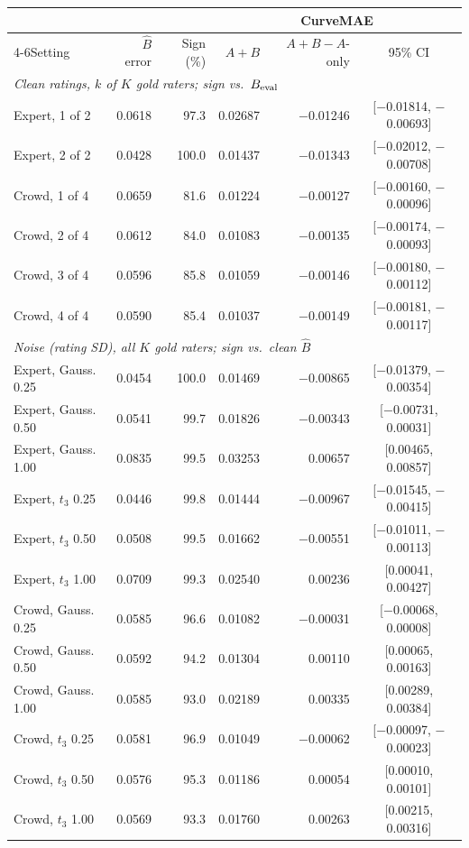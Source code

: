 \begin{tabular}{lrrrrc}
\toprule
 &  &  & \multicolumn{3}{c}{CurveMAE} \\
\cmidrule(lr){4-6}Setting & $\hat B$ error & Sign (\%) & $A{+}B$ & $A{+}B-A$-only & 95\% CI \\
\midrule
\multicolumn{6}{l}{\textit{Clean ratings, $k$ of $K$ gold raters; sign vs.\ $B_{\rm eval}$}} \\
Expert, 1 of 2 & 0.0618 & 97.3 & 0.02687 & $-$0.01246 & [$-$0.01814, $-$0.00693] \\
Expert, 2 of 2 & 0.0428 & 100.0 & 0.01437 & $-$0.01343 & [$-$0.02012, $-$0.00708] \\
Crowd, 1 of 4 & 0.0659 & 81.6 & 0.01224 & $-$0.00127 & [$-$0.00160, $-$0.00096] \\
Crowd, 2 of 4 & 0.0612 & 84.0 & 0.01083 & $-$0.00135 & [$-$0.00174, $-$0.00093] \\
Crowd, 3 of 4 & 0.0596 & 85.8 & 0.01059 & $-$0.00146 & [$-$0.00180, $-$0.00112] \\
Crowd, 4 of 4 & 0.0590 & 85.4 & 0.01037 & $-$0.00149 & [$-$0.00181, $-$0.00117] \\
\midrule
\multicolumn{6}{l}{\textit{Noise (rating SD), all $K$ gold raters; sign vs.\ clean $\hat B$}} \\
Expert, Gauss. 0.25 & 0.0454 & 100.0 & 0.01469 & $-$0.00865 & [$-$0.01379, $-$0.00354] \\
Expert, Gauss. 0.50 & 0.0541 & 99.7 & 0.01826 & $-$0.00343 & [$-$0.00731, 0.00031] \\
Expert, Gauss. 1.00 & 0.0835 & 99.5 & 0.03253 & 0.00657 & [0.00465, 0.00857] \\
Expert, $t_3$ 0.25 & 0.0446 & 99.8 & 0.01444 & $-$0.00967 & [$-$0.01545, $-$0.00415] \\
Expert, $t_3$ 0.50 & 0.0508 & 99.5 & 0.01662 & $-$0.00551 & [$-$0.01011, $-$0.00113] \\
Expert, $t_3$ 1.00 & 0.0709 & 99.3 & 0.02540 & 0.00236 & [0.00041, 0.00427] \\
Crowd, Gauss. 0.25 & 0.0585 & 96.6 & 0.01082 & $-$0.00031 & [$-$0.00068, 0.00008] \\
Crowd, Gauss. 0.50 & 0.0592 & 94.2 & 0.01304 & 0.00110 & [0.00065, 0.00163] \\
Crowd, Gauss. 1.00 & 0.0585 & 93.0 & 0.02189 & 0.00335 & [0.00289, 0.00384] \\
Crowd, $t_3$ 0.25 & 0.0581 & 96.9 & 0.01049 & $-$0.00062 & [$-$0.00097, $-$0.00023] \\
Crowd, $t_3$ 0.50 & 0.0576 & 95.3 & 0.01186 & 0.00054 & [0.00010, 0.00101] \\
Crowd, $t_3$ 1.00 & 0.0569 & 93.3 & 0.01760 & 0.00263 & [0.00215, 0.00316] \\
\bottomrule
\end{tabular}
